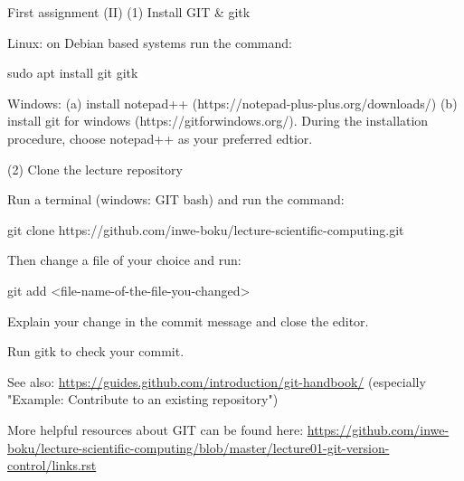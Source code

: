 \documentclass[10pt,color=usenames,dvipsnames]{beamer}
\begin{document}
\begin{frame}{First assignment (II)}
	(1) Install GIT \& gitk
	
	Linux: on Debian based systems run the command:
	
	sudo apt install git gitk
	
		Windows:
	(a) install notepad++ (https://notepad-plus-plus.org/downloads/)
	(b) install git for windows (https://gitforwindows.org/). During the installation procedure, choose notepad++ as your preferred edtior.
	
	(2) Clone the lecture repository
	
	Run a terminal (windows: GIT bash) and run the command:
	
	git clone https://github.com/inwe-boku/lecture-scientific-computing.git
	
	Then change a file of your choice and run:
	
	git add <file-name-of-the-file-you-changed>
	
	Explain your change in the commit message and close the editor.
	
	Run gitk to check your commit.
	
	See also:
	\href{https://guides.github.com/introduction/git-handbook/}{https://guides.github.com/introduction/git-handbook/}
	(especially "Example: Contribute to an existing repository")
	
	
	More helpful resources about GIT can be found here:
	\href{https://github.com/inwe-boku/lecture-scientific-computing/blob/master/lecture01-git-version-control/links.rst}
	{https://github.com/inwe-boku/lecture-scientific-computing/blob/master/lecture01-git-version-control/links.rst}

\end{frame}
\end{document}
